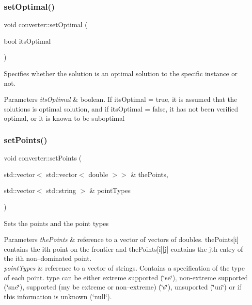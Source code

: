 \subsubsection{\texorpdfstring{set\+Optimal()}{setOptimal()}}
{\footnotesize\ttfamily void converter\+::set\+Optimal (\begin{DoxyParamCaption}\item[{bool}]{its\+Optimal }\end{DoxyParamCaption})\hspace{0.3cm}{\ttfamily [inline]}}

Specifies whether the solution is an optimal solution to the specific instance or not. 
\begin{DoxyParams}{Parameters}
{\em its\+Optimal} & boolean. If its\+Optimal = true, it is assumed that the solutions is optimal solution, and if its\+Optimal = false, it has not been verified optimal, or it is known to be suboptimal \\
\hline
\end{DoxyParams}
\mbox{\label{classconverter_a9d39c373dd13b46914dba0848b152202}} 
\subsubsection{\texorpdfstring{set\+Points()}{setPoints()}}
{\footnotesize\ttfamily void converter\+::set\+Points (\begin{DoxyParamCaption}\item[{std\+::vector$<$ std\+::vector$<$ double $>$$>$ \&}]{the\+Points,  }\item[{std\+::vector$<$ std\+::string $>$ \&}]{point\+Types }\end{DoxyParamCaption})}

Sets the points and the point types


\begin{DoxyParams}{Parameters}
{\em the\+Points} & reference to a vector of vectors of doubles. the\+Points\mbox{[}i\mbox{]} contains the i\textquotesingle{}th point on the frontier and the\+Points\mbox{[}i\mbox{]}\mbox{[}j\mbox{]} contains the j\textquotesingle{}th entry of the i\textquotesingle{}th non--dominated point. \\
\hline
{\em point\+Types} & reference to a vector of strings. Contains a specification of the type of each point. type can be either extreme supported (\char`\"{}se\char`\"{}), non-\/extreme supported (\char`\"{}sne\char`\"{}), supported (my be extreme or non--extreme) (\char`\"{}s\char`\"{}), unsuported (\char`\"{}un\char`\"{}) or if this information is unknown (\char`\"{}null\char`\"{}). \\
\hline
\end{DoxyParams}
\mbox{\label{classconverter_a6a9303c575455682facf0e28327f1a4b}} 
